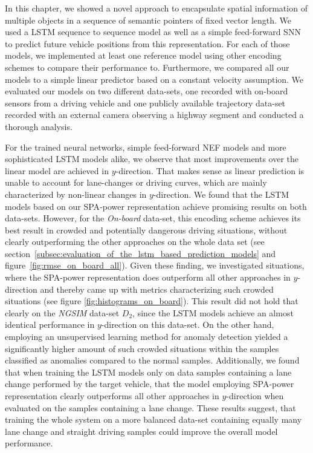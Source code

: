 In this chapter, we showed a novel approach to encapsulate spatial information of multiple objects in a sequence of semantic pointers of fixed vector length.
We used a \ac{LSTM} sequence to sequence model as well as a simple feed-forward \acl{SNN} to predict future vehicle positions from this representation.
For each of those models, we implemented at least one reference model using other encoding schemes to compare their performance to.
Furthermore, we compared all our models to a simple linear predictor based on a constant velocity assumption.
We evaluated our models on two different data-sets, one recorded with on-board sensors from a driving vehicle and one publicly available trajectory data-set recorded with an external camera observing a highway segment and conducted a thorough analysis.

For the trained neural networks, simple feed-forward \ac{NEF} models and more sophisticated \ac{LSTM} models alike, we observe that most improvements over the linear model are achieved in $y$-direction.
That makes sense as linear prediction is unable to account for lane-changes or driving curves, which are mainly characterized by non-linear changes in $y$-direction.
We found that the \ac{LSTM} models based on our \ac{SPA}-power representation achieve promising results on both data-sets.
However, for the \emph{On-board} data-set, this encoding scheme achieves its best result in crowded and potentially dangerous driving situations, without clearly outperforming the other approaches on the whole data set (see section~\ref{subsec:evaluation_of_the_lstm_based_prediction_models} and figure~\ref{fig:rmse_on_board_all}).
Given these finding, we investigated situations, where the \ac{SPA}-power representation does outperform all other approaches in $y$-direction and thereby came up with metrics characterizing such crowded situations (see figure \ref{fig:histograms_on_board}).
This result did not hold that clearly on the \emph{\ac{NGSIM}} data-set $D_2$, since the \ac{LSTM} models achieve an almost identical performance in $y$-direction on this data-set.
On the other hand, employing an unsupervised learning method for anomaly detection yielded a significantly higher amount of such crowded situations within the samples classified as anomalies compared to the normal samples.
Additionally, we found that when training the \ac{LSTM} models only on data samples containing a lane change performed by the target vehicle, that the model employing \ac{SPA}-power representation clearly outperforms all other approaches in $y$-direction when evaluated on the samples containing a lane change.
These results suggest, that training the whole system on a more balanced data-set containing equally many lane change and straight driving samples could improve the overall model performance.

